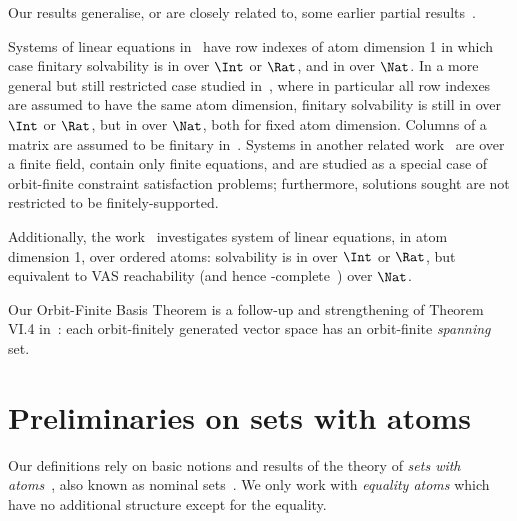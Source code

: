 Our results generalise, or are closely related to, some earlier %
partial results~\cite{DBLP:conf/lics/HofmanLT17,DBLP:conf/lics/KlinKOT15,HR21}.

Systems of linear equations in~\cite{DBLP:conf/lics/HofmanLT17} have row indexes of atom dimension 1 
in which case finitary solvability is in \PTIME over $\Int$ or $\Rat$, and in \NP over $\Nat$.
In a more general but still restricted case studied in~\cite{HR21}, where in particular 
all row indexes are assumed to have the same atom dimension, 
finitary solvability is still in \PTIME
over $\Int$ or $\Rat$, but in \ETIME over $\Nat$, both for fixed atom dimension.
Columns of a matrix are assumed to be finitary in~\cite{DBLP:conf/lics/HofmanLT17,HR21}.
%
Systems in another related work~\cite{DBLP:conf/lics/KlinKOT15} are over a finite field, contain only 
finite equations, and are studied as a special case of orbit-finite constraint satisfaction problems;
furthermore, solutions sought are not restricted to be finitely-supported.

Additionally, the work~\cite{HL18} investigates system of linear equations, in atom dimension 1,
 over ordered atoms:
solvability is in \PTIME over $\Int$ or $\Rat$, but equivalent to VAS reachability  
(and hence \ackermann-complete~\cite{CO,L,Lasota22}) over $\Nat$.

Our Orbit-Finite Basis Theorem is a follow-up and strengthening of Theorem VI.4 in~\cite{BKM21}:
each orbit-finitely generated vector space has an orbit-finite \emph{spanning} set.
  



\section{Preliminaries on sets with atoms} \label{sec:atoms}

%
Our definitions rely on basic notions and results of the theory of \emph{sets with atoms}~\cite{atombook}, 
also known as nominal sets~\cite{Pitts:book}. 
We only work with \emph{equality atoms} which have no additional structure except for
the equality.


